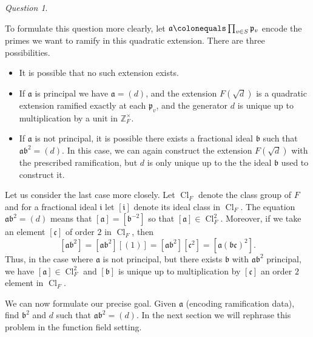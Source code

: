 \documentclass{dcthesis}
\newcommand{\ZZ}{\mathbb Z}
\DeclareMathOperator{\Cl}{Cl}
\numberwithin{equation}{section}
\theoremstyle{definition}
\theoremstyle{remark}
\newtheorem{question}[equation]{Question}
\begin{document}
{{\begin{question}
    \end{question}
    To formulate this question more clearly,
    let
    $
      \mathfrak{a}\colonequals
      \prod_{v\in S}\mathfrak{p}_v
    $
    encode the primes
    we want to ramify in this quadratic extension.
    There are three possibilities.
    \begin{itemize}
      \item
        It is possible that no such
        extension exists.
      \item
        If $\mathfrak{a}$ is principal
        we have $\mathfrak{a} = (d)$,
        and the extension
        $F(\sqrt{d})$ is a quadratic extension
        ramified exactly at each $\mathfrak{p}_v$,
        and the generator $d$ is unique
        up to multiplication
        by a unit in $\ZZ_F^\times$.
      \item
        If $\mathfrak{a}$ is not principal,
        it is possible there
        exists a fractional ideal
        $\mathfrak{b}$ such that
        $\mathfrak{a}\mathfrak{b}^2=(d)$.
        In this case,
        we can again construct the extension
        $F(\sqrt{d})$ with the prescribed
        ramification,
        but $d$ is only unique up to
        the the ideal $\mathfrak{b}$ used
        to construct it.
    \end{itemize}
    Let us consider the last case more closely.
    Let $\Cl_F$ denote the class group of $F$
    and for a fractional ideal
    $\mathfrak{i}$ let $[\mathfrak{i}]$
    denote its ideal class in $\Cl_F$.
    The equation $\mathfrak{a}\mathfrak{b}^2=(d)$
    means that $[\mathfrak{a}] = [\mathfrak{b}^{-2}]$
    so that $[\mathfrak{a}]\in\Cl_F^2$.
    Moreover, if we take an element
    $[\mathfrak{c}]$
    of order $2$
    in $\Cl_F$,
    then
    \begin{equation}
      \label{eqn:twotorsionintheclassgroup}
      [\mathfrak{a}\mathfrak{b}^2]
      =[\mathfrak{a}\mathfrak{b}^2][(1)]
      =[\mathfrak{a}\mathfrak{b}^2][\mathfrak{c}^2]
      =[\mathfrak{a}(\mathfrak{bc})^2].
    \end{equation}
    Thus,
    in the case where $\mathfrak{a}$ is not
    principal,
    but there exists $\mathfrak{b}$ with
    $\mathfrak{a}\mathfrak{b}^2$ principal,
    we have
    $[\mathfrak{a}]\in\Cl_F^2$ and
    $[\mathfrak{b}]$ is unique up to
    multiplication by $[\mathfrak{c}]$
    an order $2$ element in $\Cl_F$.
    \par
    We can now formulate our precise goal.
    Given $\mathfrak{a}$
    (encoding ramification data),
    find $\mathfrak{b}^2$ and $d$ such that
    $\mathfrak{a}\mathfrak{b}^2=(d)$.
    In the next section we will rephrase this
    problem in the function field setting.
  }
}
\end{document}
